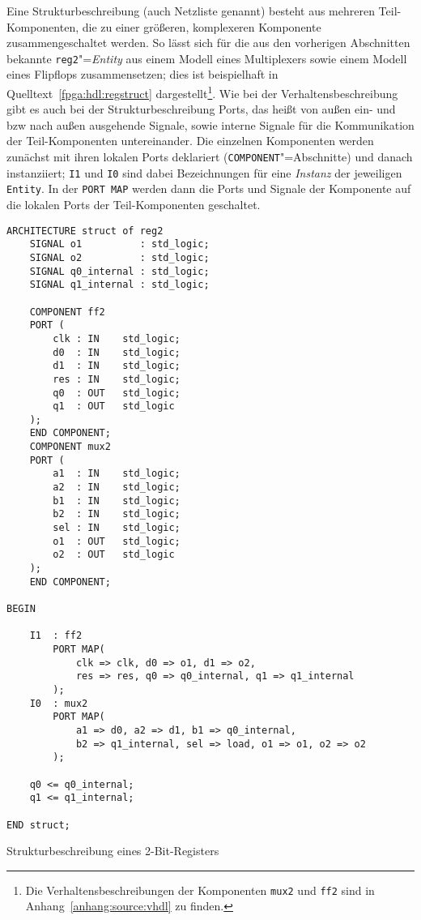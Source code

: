 Eine Strukturbeschreibung (auch Netzliste genannt) besteht aus mehreren
Teil-Komponenten, die zu einer größeren, komplexeren Komponente 
zusammengeschaltet werden. So lässt sich für die aus den vorherigen Abschnitten
bekannte \texttt{reg2}"=\textit{Entity} aus einem Modell eines Multiplexers
sowie einem Modell eines Flipflops zusammensetzen; dies ist beispielhaft in
Quelltext~\ref{fpga:hdl:regstruct} dargestellt\footnote{Die
Verhaltensbeschreibungen der Komponenten \texttt{mux2} und \texttt{ff2} sind in
Anhang~\ref{anhang:source:vhdl} zu finden.}. Wie bei der
Verhaltensbeschreibung gibt es auch bei der Strukturbeschreibung Ports, das
heißt von außen ein- und bzw nach außen ausgehende Signale, sowie interne
Signale für die Kommunikation der Teil-Komponenten untereinander. Die einzelnen
Komponenten werden zunächst mit ihren lokalen Ports deklariert
(\texttt{COMPONENT}"=Abschnitte) und danach instanziiert; \texttt{I1} und
\texttt{I0} sind dabei Bezeichnungen für eine \textit{Instanz} der jeweiligen
\texttt{Entity}. In der \texttt{PORT MAP} werden dann die Ports und Signale
der Komponente auf die lokalen Ports der Teil-Komponenten geschaltet.
\cite[vgl.][37]{kesel2013}

\begin{code}
    \begin{verbatim}
ARCHITECTURE struct of reg2
    SIGNAL o1          : std_logic;
    SIGNAL o2          : std_logic;
    SIGNAL q0_internal : std_logic;
    SIGNAL q1_internal : std_logic;

    COMPONENT ff2
    PORT (
        clk : IN    std_logic;
        d0  : IN    std_logic;
        d1  : IN    std_logic;
        res : IN    std_logic;
        q0  : OUT   std_logic;
        q1  : OUT   std_logic
    );
    END COMPONENT;
    COMPONENT mux2
    PORT (
        a1  : IN    std_logic;
        a2  : IN    std_logic;
        b1  : IN    std_logic;
        b2  : IN    std_logic;
        sel : IN    std_logic;
        o1  : OUT   std_logic;
        o2  : OUT   std_logic
    );
    END COMPONENT;

BEGIN

    I1  : ff2
        PORT MAP(
            clk => clk, d0 => o1, d1 => o2,
            res => res, q0 => q0_internal, q1 => q1_internal
        );
    I0  : mux2
        PORT MAP(
            a1 => d0, a2 => d1, b1 => q0_internal,
            b2 => q1_internal, sel => load, o1 => o1, o2 => o2
        );

    q0 <= q0_internal;
    q1 <= q1_internal;

END struct;
    \end{verbatim}
    \caption{Strukturbeschreibung eines 2-Bit-Registers \cite[siehe][36]{kesel2013}}
    \label{fpga:hdl:regstruct}
\end{code}

